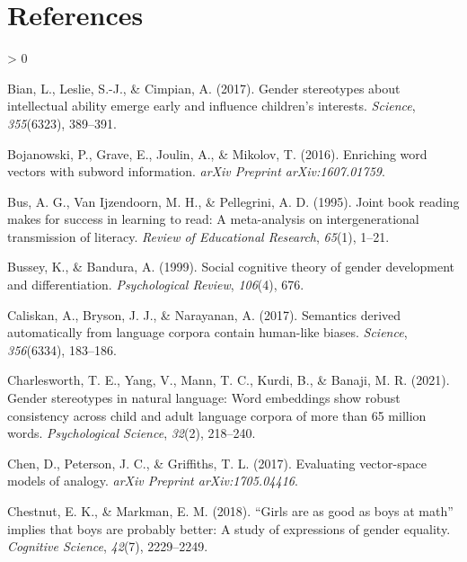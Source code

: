\documentclass[
  english,
  ,man,floatsintext]{apa6}
\newlength{\cslhangindent}
\newenvironment{CSLReferences}[2] %
 {%
  \setlength{\parindent}{0pt}
  \ifodd #1 \everypar{\setlength{\hangindent}{\cslhangindent}}\ignorespaces\fi
  \ifnum #2 > 0
  \setlength{\parskip}{#2\baselineskip}
  \fi
 }%
 {}
\begin{document}
\newpage

\hypertarget{references}{%
\section{References}\label{references}}

\setlength{\parindent}{-0.5in}
\setlength{\leftskip}{0.5in}

\hypertarget{refs}{}
\begin{CSLReferences}{1}{0}
\leavevmode\hypertarget{ref-bian2017gender}{}%
Bian, L., Leslie, S.-J., \& Cimpian, A. (2017). Gender stereotypes about intellectual ability emerge early and influence children's interests. \emph{Science}, \emph{355}(6323), 389--391.

\leavevmode\hypertarget{ref-bojanowski2016enriching}{}%
Bojanowski, P., Grave, E., Joulin, A., \& Mikolov, T. (2016). Enriching word vectors with subword information. \emph{arXiv Preprint arXiv:1607.01759}.

\leavevmode\hypertarget{ref-bus1995joint}{}%
Bus, A. G., Van Ijzendoorn, M. H., \& Pellegrini, A. D. (1995). Joint book reading makes for success in learning to read: A meta-analysis on intergenerational transmission of literacy. \emph{Review of Educational Research}, \emph{65}(1), 1--21.

\leavevmode\hypertarget{ref-bussey1999social}{}%
Bussey, K., \& Bandura, A. (1999). Social cognitive theory of gender development and differentiation. \emph{Psychological Review}, \emph{106}(4), 676.

\leavevmode\hypertarget{ref-caliskan2017semantics}{}%
Caliskan, A., Bryson, J. J., \& Narayanan, A. (2017). Semantics derived automatically from language corpora contain human-like biases. \emph{Science}, \emph{356}(6334), 183--186.

\leavevmode\hypertarget{ref-charlesworth2021gender}{}%
Charlesworth, T. E., Yang, V., Mann, T. C., Kurdi, B., \& Banaji, M. R. (2021). Gender stereotypes in natural language: Word embeddings show robust consistency across child and adult language corpora of more than 65 million words. \emph{Psychological Science}, \emph{32}(2), 218--240.

\leavevmode\hypertarget{ref-chen2017evaluating}{}%
Chen, D., Peterson, J. C., \& Griffiths, T. L. (2017). Evaluating vector-space models of analogy. \emph{arXiv Preprint arXiv:1705.04416}.

\leavevmode\hypertarget{ref-chestnut2018girls}{}%
Chestnut, E. K., \& Markman, E. M. (2018). {``Girls are as good as boys at math''} implies that boys are probably better: A study of expressions of gender equality. \emph{Cognitive Science}, \emph{42}(7), 2229--2249.


\end{CSLReferences}
\end{document}
